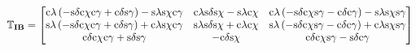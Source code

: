 \begin{equation} \label{eq:IBtransTSI}
\mathbb{T}_{\mathbf{IB}}=
\left[
\begin{matrix}
\text{c}\lambda\left(-\text{s}\delta \text{c}\chi \text{c}\gamma +\text{c}\delta \text{s}\gamma \right)-\text{s}\lambda \text{s}\chi \text{c}\gamma  & \text{c}\lambda \text{s}\delta \text{s}\chi -\text{s}\lambda \text{c}\chi & \text{c}\lambda\left(-\text{s}\delta \text{c}\chi \text{s}\gamma -\text{c}\delta \text{c}\gamma \right)-\text{s}\lambda \text{s}\chi \text{s}\gamma \\
\text{s}\lambda\left(-\text{s}\delta \text{c}\chi \text{c}\gamma +\text{c}\delta \text{s}\gamma \right)+\text{c}\lambda \text{s}\chi \text{c}\gamma & \text{s}\lambda \text{s}\delta \text{s}\chi +\text{c}\lambda \text{c}\chi & \text{s}\lambda\left(-\text{s}\delta \text{c}\chi \text{s}\gamma -\text{c}\delta \text{c}\gamma \right)+\text{c}\lambda \text{s}\chi \text{s}\gamma \\
\text{c}\delta \text{c}\chi \text{c}\gamma +\text{s}\delta \text{s}\gamma &  -\text{c}\delta \text{s}\chi &  \text{c}\delta \text{c}\chi \text{s}\gamma -\text{s}\delta \text{c}\gamma \\
\end{matrix}
\right]\\
\end{equation}



